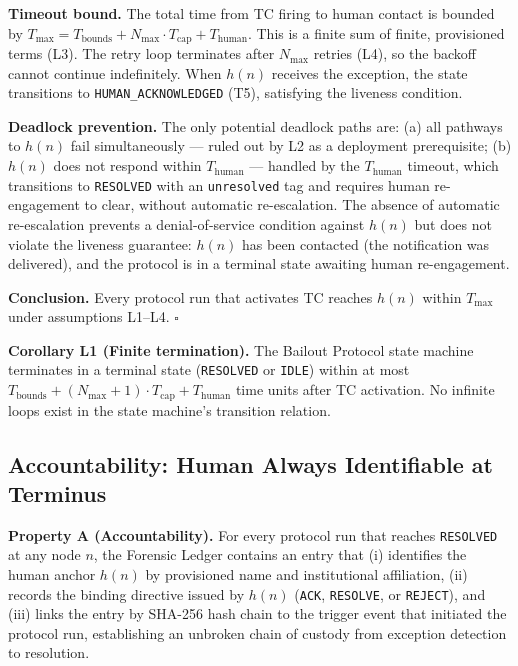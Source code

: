 \textbf{Timeout bound.} The total time from TC firing to human contact is bounded by $T_{\max} = T_{\text{bounds}} + N_{\max} \cdot T_{\text{cap}} + T_{\text{human}}$. This is a finite sum of finite, provisioned terms (L3). The retry loop terminates after $N_{\max}$ retries (L4), so the backoff cannot continue indefinitely. When $h(n)$ receives the exception, the state transitions to \texttt{HUMAN\_ACKNOWLEDGED} (T5), satisfying the liveness condition.

\textbf{Deadlock prevention.} The only potential deadlock paths are: (a) all pathways to $h(n)$ fail simultaneously --- ruled out by L2 as a deployment prerequisite; (b) $h(n)$ does not respond within $T_{\text{human}}$ --- handled by the $T_{\text{human}}$ timeout, which transitions to \texttt{RESOLVED} with an \texttt{unresolved} tag and requires human re-engagement to clear, without automatic re-escalation. The absence of automatic re-escalation prevents a denial-of-service condition against $h(n)$ but does not violate the liveness guarantee: $h(n)$ has been contacted (the notification was delivered), and the protocol is in a terminal state awaiting human re-engagement.

\textbf{Conclusion.} Every protocol run that activates TC reaches $h(n)$ within $T_{\max}$ under assumptions L1--L4. $\square$

\bigskip
\noindent\textbf{Corollary L1 (Finite termination).} The Bailout Protocol state machine terminates in a terminal state (\texttt{RESOLVED} or \texttt{IDLE}) within at most $T_{\text{bounds}} + (N_{\max} + 1) \cdot T_{\text{cap}} + T_{\text{human}}$ time units after TC activation. No infinite loops exist in the state machine's transition relation.

\subsection{Accountability: Human Always Identifiable at Terminus}\label{sec:accountability}

\textbf{Property A (Accountability).} For every protocol run that reaches \texttt{RESOLVED} at any node $n$, the Forensic Ledger contains an entry that (i) identifies the human anchor $h(n)$ by provisioned name and institutional affiliation, (ii) records the binding directive issued by $h(n)$ (\texttt{ACK}, \texttt{RESOLVE}, or \texttt{REJECT}), and (iii) links the entry by SHA-256 hash chain to the trigger event that initiated the protocol run, establishing an unbroken chain of custody from exception detection to resolution.

